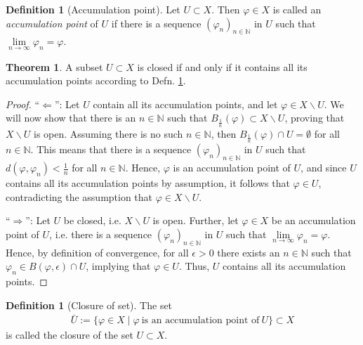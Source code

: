 \documentclass[12pt, a4paper]{article}
\numberwithin{equation}{section}
\theoremstyle{definition}
\theoremstyle{definition}
\newtheorem{defn}[thm]{Definition} %
\newtheorem{theorem}[thm]{Theorem}
\begin{document}
	\begin{defn}[Accumulation point]\label{defn:accumulation_point}
		Let $U\subset X$. Then $\varphi\in X$ is called an \textit{accumulation point} of $U$ if there is a sequence $\left(\varphi_{n}\right)_{n\in \mathbb N}$ in $U$ such that $\lim\limits_{n\to\infty}\varphi_{n} = \varphi$.
	\end{defn}

	\begin{theorem}\label{thm:closed_set_acc_point}
		A subset $U \subset X$ is closed if and only if it contains all its accumulation points according to Defn. \ref{defn:accumulation_point}.
	\end{theorem}

	\begin{proof}
		\enquote{$\Longleftarrow$}: Let $U$ contain all its accumulation points, and let $\varphi\in X\backslash U$. We will now show that there is an $n\in \mathbb N$ such that $B_{\frac{1}{n}}(\varphi) \subset X\backslash U$, proving that $X\backslash U$ is open. Assuming there is no such $n\in \mathbb N$, then $B_{\frac{1}{n}}(\varphi) \cap U = \emptyset$ for all $n\in \mathbb N$. This means that there is a sequence $(\varphi_{n})_{n\in\mathbb N}$ in $U$ such that $d(\varphi, \varphi_n) < \frac{1}{n}$ for all $n\in\mathbb N$. Hence, $\varphi$ is an accumulation point of $U$, and since $U$ contains all its accumulation points by assumption, it follows that $\varphi\in U$, contradicting the assumption that $\varphi\in X\backslash U$.
		
		\enquote{$\Longrightarrow$}: Let $U$ be closed, i.e. $X\backslash U$ is open. Further, let $\varphi\in X$ be an accumulation point of $U$, i.e. there is a sequence $(\varphi_n)_{n\in\mathbb N}$ in $U$ such that $\lim\limits_{n\to\infty}\varphi_n = \varphi$. Hence, by definition of convergence, for all $\epsilon > 0$ there exists an $n\in\mathbb N$ such that $\varphi_n\in B(\varphi, \epsilon) \cap U$, implying that $\varphi\in U$. Thus, $U$ contains all its accumulation points.
	\end{proof}
	
	\begin{defn}[Closure of set]\label{defn:closure_set}
		The set 
		\begin{align}
			\bar{U} := \{\varphi\in X\mid \varphi\ \text{is an accumulation point of}\ U\} \subset X
		\end{align}
		is called the closure of the set $U \subset X$.
	\end{defn}
\end{document}
